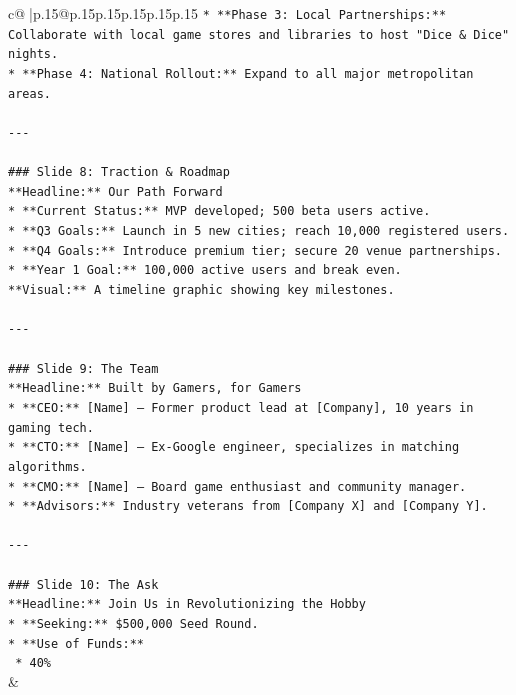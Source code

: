 \documentclass{article}
\begin{document}
{\begin{supertabular}{c@{$\;$}|p{.15\linewidth}@{}p{.15\linewidth}p{.15\linewidth}p{.15\linewidth}p{.15\linewidth}p{.15\linewidth}}
{{{\texttt{*   **Phase 3: Local Partnerships:** Collaborate with local game stores and libraries to host "Dice \& Dice" nights.} \\
\texttt{*   **Phase 4: National Rollout:** Expand to all major metropolitan areas.} \\
\\ 
\texttt{{-}{-}{-}} \\
\\ 
\texttt{\#\#\# Slide 8: Traction \& Roadmap} \\
\texttt{**Headline:** Our Path Forward} \\
\texttt{*   **Current Status:** MVP developed; 500 beta users active.} \\
\texttt{*   **Q3 Goals:** Launch in 5 new cities; reach 10,000 registered users.} \\
\texttt{*   **Q4 Goals:** Introduce premium tier; secure 20 venue partnerships.} \\
\texttt{*   **Year 1 Goal:** 100,000 active users and break even.} \\
\texttt{**Visual:** A timeline graphic showing key milestones.} \\
\\ 
\texttt{{-}{-}{-}} \\
\\ 
\texttt{\#\#\# Slide 9: The Team} \\
\texttt{**Headline:** Built by Gamers, for Gamers} \\
\texttt{*   **CEO:** {[}Name{]} – Former product lead at {[}Company{]}, 10 years in gaming tech.} \\
\texttt{*   **CTO:** {[}Name{]} – Ex{-}Google engineer, specializes in matching algorithms.} \\
\texttt{*   **CMO:** {[}Name{]} – Board game enthusiast and community manager.} \\
\texttt{*   **Advisors:** Industry veterans from {[}Company X{]} and {[}Company Y{]}.} \\
\\ 
\texttt{{-}{-}{-}} \\
\\ 
\texttt{\#\#\# Slide 10: The Ask} \\
\texttt{**Headline:** Join Us in Revolutionizing the Hobby} \\
\texttt{*   **Seeking:** \$500,000 Seed Round.} \\
\texttt{*   **Use of Funds:**} \\
\texttt{    *   40\%} \\
            }
        }
    }
    & \\ \\


\end{supertabular}}
\end{document}
